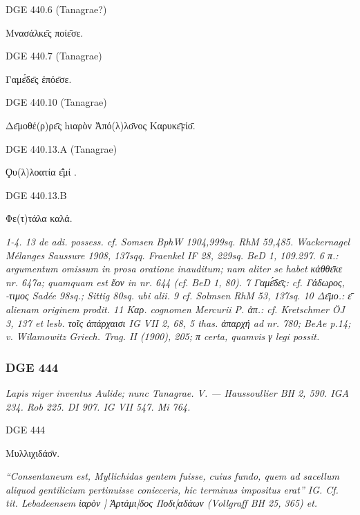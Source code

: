 \begin{versi}{DGE 440.6}
(Tanagrae?)
\begin{greek}
Μνασάλκε̄ς ποίε̄σε.
\end{greek}
\end{versi}

\begin{versi}{DGE 440.7}
(Tanagrae)
\begin{greek}
Γαμε̄́δε̄ς ἐπόε̄σε.
\end{greek}
\end{versi}

\begin{versi}{DGE 440.10}
(Tanagrae)
\begin{greek}
Δε̄μοθέ(ρ)ρε̄ς hιαρὸν Ἀπό(λ)λο̄νος Καρυκε̄ϝίο̄.
\end{greek}
\end{versi}

\begin{versi}{DGE 440.13.A}
(Tanagrae)
\begin{greek}
Ϙυ(λ)λοατία ε̄̓μί .
\end{greek}
\end{versi}

\begin{versi}{DGE 440.13.B}
\begin{greek}
Φε(τ)τάλα καλά.
\end{greek}
\end{versi}
\textit{1-4. 13 de adi. possess. cf. Somsen BphW 1904,999sq. RhM 59,485. Wackernagel Mélanges Saussure 1908, 137sqq. Fraenkel IF 28, 229sq. BeD 1, 109.297. 6 \textgreek{π}.: argumentum omissum in prosa oratione inauditum; nam aliter se habet \textgreek{κάθθε̄κε} nr. 647a; quamquam est \textgreek{ἔον} in nr. 644 (cf. BeD 1, 80). 7 \textgreek{Γαμε̄́δε̄ς}: cf. \textgreek{Γάδωρος}, \textgreek{-τιμος} Sadée 98sq.; Sittig 80sq. ubi alii. 9 cf. Solmsen RhM 53, 137sq. 10 \textgreek{Δε̄μο}.: \textgreek{ε̄ } alienam originem prodit. 11 Καρ. cognomen Mercurii P. \textgreek{ἀπ.}: cf. Kretschmer ÖJ 3, 137 et lesb.  \textgreek{τοῖς ἀπάρχαισι} IG VII 2, 68, 5 thas. \textgreek{ἀπαρχή} ad nr. 780; BeAe p.14; v. Wilamowitz Griech. Trag. II (1900), 205; \textgreek{π} certa, quamvis \textgreek{γ} legi possit.}

\hrulefill

\subsubsection{DGE 444}
\textit{Lapis niger inventus Aulide; nunc Tanagrae. V. — Haussoullier BH 2, 590. IGA 234. Rob 225. DI 907. IG VII 547. Mi 764.}
\begin{versi}{DGE 444}
\begin{greek}
Μυλλιχιδάο̄ν.
\end{greek}
\end{versi}
\textit{``Consentaneum est, Myllichidas gentem fuisse, cuius fundo, quem ad sacellum aliquod gentilicium pertinuisse conieceris, hic terminus impositus erat'' IG. Cf. tit. Lebadeensem \textgreek{ἱαρὸν | Ἀρτάμι|δος Ποδι|αδάων} (Vollgraff BH 25, 365) et.}


